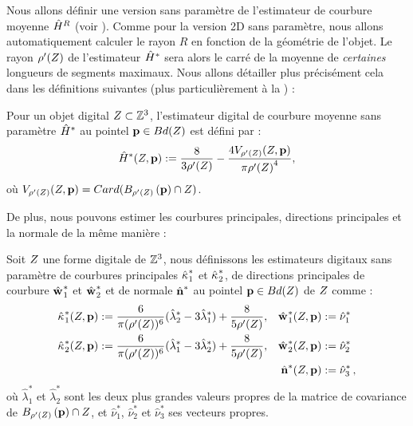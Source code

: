 Nous allons définir une version sans paramètre de l'estimateur de courbure
moyenne $\hat{H}^{R}$ (voir ).
Comme pour la version 2D sans paramètre, nous allons automatiquement calculer le
rayon $R$ en fonction de la géométrie de l'objet. Le rayon $\rho'(Z)$ de
l'estimateur $\hat{H}^{*}$ sera alors le carré de la moyenne de \emph{certaines}
longueurs de segments maximaux. Nous allons détailler plus précisément cela
dans les définitions suivantes (plus particulièrement à la ) :
%
\begin{definition}
  Pour un objet digital $Z \subset \mathbb{Z}^3$, l'estimateur digital de
  courbure moyenne sans paramètre $\hat{H}^{*}$ au pointel $\mathbf{p} \in
  Bd({Z})$ est défini par :
  \begin{equation}
    \hat{H}^{*}( Z, \mathbf{p} ) := \frac{8}{3 {\rho'(Z)}} - \frac{4 V_{{\rho'(Z)}}(Z, \mathbf{p})}{\pi{{\rho'(\ensuremath{Z})}}^4} ,
    \label{def:curvature-estimator-3d-mean-pf}
  \end{equation}
  où $V_{\rho'(Z)}(Z, \mathbf{p}) = Card(B_{\rho'(Z)}\left(\mathbf{p}\right) \cap Z)$.
\end{definition}
%
De plus, nous pouvons estimer les courbures principales, directions principales
et la normale de la même manière :
%
\begin{definition}
  Soit $Z$ une forme digitale de $\mathbb{Z}^3$, nous définissons les estimateurs
  digitaux sans paramètre de courbures principales $\hat{\kappa_{}}_{1}^{*}$ et
  $\hat{\kappa_{}}_{2}^{*}$, de directions principales de courbure $\hat{\mathbf{w}_{}}_{1}^{*}$ et
  $\hat{\mathbf{w}_{}}_{2}^{*}$ et de normale $\hat{\mathbf{n}{}}^{*}$ au pointel $\mathbf{p} \in
  Bd({Z})$ de $Z$ comme :
  \begin{align}
      \hat{\kappa_{}}_{1}^{*}(Z, \mathbf{p})  &:= \frac{6}{\pi (\rho'(Z))^6}(\hat{\lambda}^{*}_2 - 3\hat{\lambda}^{*}_1) + \frac{8}{5 \rho'(Z)},
      &\hat{\mathbf{w}_{}}_{1}^{*}(Z, \mathbf{p}) &:= \hat{\nu}^{*}_1 \\
      \hat{\kappa_{}}_{2}^{*}(Z, \mathbf{p}) &:= \frac{6}{\pi (\rho'(Z))^6}(\hat{\lambda}^{*}_1 - 3\hat{\lambda}^{*}_2) + \frac{8}{5 \rho'(Z)},
      &\hat{\mathbf{w}_{}}_{2}^{*}(Z, \mathbf{p}) &:= \hat{\nu}^{*}_2\\
      & &\hat{\mathbf{n}{}}^{*}(Z, \mathbf{p}) &:=\hat{\nu}^{*}_3 \,,
  \end{align}
  où $\hat{\lambda}^{*}_1$ et $\hat{\lambda}^{*}_2$ sont les deux plus grandes
  valeurs propres de la matrice de covariance de $B_{{\rho'(Z)}}\left(\mathbf{p}\right)
  \cap Z$, et $ \hat{\nu}^{*}_1$, $\hat{\nu}^{*}_2$ et $\hat{\nu}^{*}_3$
  ses vecteurs propres.
  \label{def:curvature-estimator-3d-k1k2-pf}
\end{definition}
